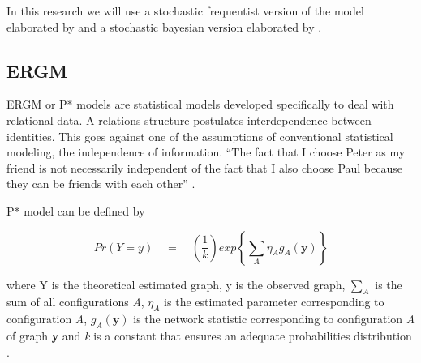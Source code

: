 \documentclass[a4paper, 12pt, openright, oneside, german, french, brazil, english, article]{abntex2}
\begin{document}
	
	In this research we will use a stochastic frequentist version of the model elaborated by  and a stochastic bayesian version elaborated by .
	
	
	\subsection{ERGM}
	
	
	ERGM or P* models \cite{robins2007introduction,lusher2013exponential,lazega2014redes,brailly2017explorer} are statistical models developed specifically to deal with relational data. A relations structure postulates interdependence between identities. This goes against one of the assumptions of conventional statistical modeling, the independence of information. ``The fact that I choose Peter as my friend is not necessarily independent of the fact that I also choose Paul because they can be friends with each other'' \cite[p. 76]{lazega2014redes}.
	
	P* model can be defined by
	
		
	$$Pr(Y=y) \quad = \quad \left(\frac{1}{k}\right) exp \left\{ \sum_{A} \eta_A g_A (\textbf{y}) \right\}$$
	
	where Y is the theoretical estimated graph, y is the observed graph, $\sum_{A}$ is the sum of all configurations \textit{A},  $\eta_A$ is the estimated parameter corresponding to configuration \textit{A}, $g_A(\textbf{y})$ is the network statistic corresponding to configuration \textit{A} of graph \textbf{y} and \textit{k} is a constant that ensures an adequate probabilities distribution \cite{robins2007introduction}.
		
\end{document}
